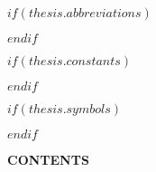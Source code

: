 $if(thesis.abbreviations)$
\begingroup
\renewcommand{\chapteralign}{\centering}

 \thispagestyle{empty}  
\endgroup
$endif$

$if(thesis.constants)$



$endif$

$if(thesis.symbols)$
\begingroup
\renewcommand{\chapteralign}{\centering}

 \thispagestyle{empty}  
\endgroup
$endif$


% 
% 

\cleardoublepage
{}
\hypersetup{linkcolor=$if(toclinkcolor)$$toclinkcolor$$else$black$endif$}
\begingroup
  \renewcommand{\chapteralign}{\centering}
  \renewcommand{\chapterfont}{\bfseries\normalsize}
    \renewcommand{\abovechapterskip}{\vspace*{-1.0\baselineskip}}
  \renewcommand{\chapterbelowskip}{\vspace*{12pt}}
  \abovechapterskip
  {\chapteralign \chapterfont CONTENTS\par}
  \chapterbelowskip
\endgroup
\makeatletter
{}
\makeatother

